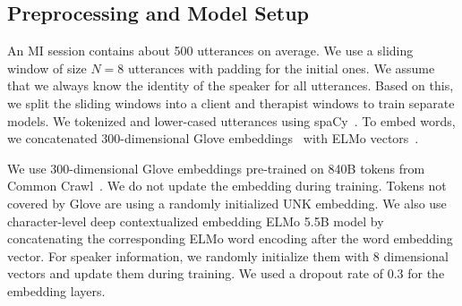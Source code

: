 
\subsection{Preprocessing and Model Setup}
\label{ssec:snt:exp_setup}


 An MI session contains about 500 utterances on average. We use a
sliding window of size $N=8$ utterances with padding for the initial
ones. We assume that we always know the identity of the speaker for
all utterances. Based on this, we split the sliding windows into a
client and therapist windows to train separate models.
%
We tokenized and lower-cased utterances using
spaCy~\cite{spacy2}. To embed words, we concatenated 300-dimensional
Glove embeddings~\cite{pennington2014glove} with ELMo
vectors~\cite{Peters:2018}.

 We use 300-dimensional Glove embeddings
pre-trained on 840B tokens from Common
Crawl~\cite{pennington2014glove}. We do not update the embedding
during training. Tokens not covered by Glove are using a randomly
initialized UNK embedding. We also use character-level deep
contextualized embedding ELMo 5.5B model by concatenating the
corresponding ELMo word encoding after the word embedding vector. For
speaker information, we randomly initialize them with 8 dimensional
vectors and update them during training. We used a dropout rate of 0.3
for the embedding layers.

